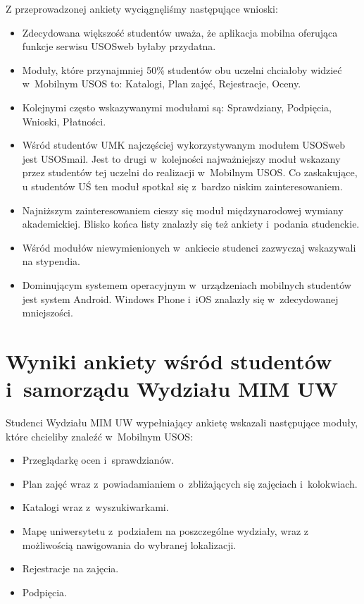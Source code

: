 \documentclass{pracamgr}
\begin{document}
Z przeprowadzonej ankiety wyciągnęliśmy następujące wnioski:
\begin{itemize}
	\item Zdecydowana większość studentów uważa, że aplikacja mobilna oferująca funkcje serwisu USOSweb byłaby przydatna.
	\item Moduły, które przynajmniej 50\% studentów obu uczelni chciałoby widzieć w~Mobilnym USOS to: Katalogi, Plan zajęć, Rejestracje, Oceny.
	\item Kolejnymi często wskazywanymi modułami są: Sprawdziany, Podpięcia, Wnioski, Płatności.
	\item Wśród studentów UMK najczęściej wykorzystywanym modułem USOSweb jest USOSmail. Jest to drugi w~kolejności najważniejszy moduł wskazany przez studentów tej uczelni do realizacji w~Mobilnym USOS. Co zaskakujące, u studentów UŚ ten moduł spotkał się z~bardzo niskim zainteresowaniem.
	\item Najniższym zainteresowaniem cieszy się moduł międzynarodowej wymiany akademickiej. Blisko końca listy znalazły się też ankiety i~podania studenckie.
	\item Wśród modułów niewymienionych w~ankiecie studenci zazwyczaj wskazywali na stypendia.
	\item Dominującym systemem operacyjnym w~urządzeniach mobilnych studentów jest system Android. Windows Phone i~iOS znalazły się w~zdecydowanej mniejszości.
\end{itemize}

\section{Wyniki ankiety wśród studentów i~samorządu Wydziału MIM UW}

Studenci Wydziału MIM UW wypełniający ankietę wskazali następujące moduły, które
chcieliby znaleźć w~Mobilnym USOS:

\begin{itemize}
	\item Przeglądarkę ocen i~sprawdzianów.
	\item Plan zajęć wraz z~powiadamianiem o~zbliżających się zajęciach
	      i~kolokwiach.
	\item Katalogi wraz z~wyszukiwarkami.
	\item Mapę uniwersytetu z~podziałem na poszczególne wydziały, wraz z
	      możliwością nawigowania do wybranej lokalizacji.
	\item Rejestracje na zajęcia.
	\item Podpięcia.
\end{itemize}
\end{document}
